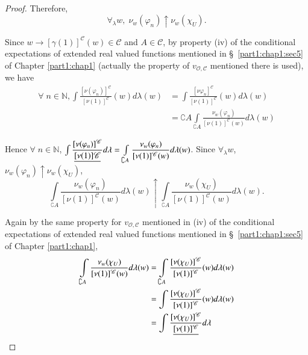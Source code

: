 \begin{proof}
Therefore, 
$$
\forall_\lambda w, \; \nu_w (\varphi_n) \uparrow \nu_w(\chi_U). 
$$

Since $w \to [\gamma (1)]^\mathscr{C}(w) \in \mathscr{C}$  and $A \in
\mathscr{C}$, by property (iv) of the conditional expectations of
extended real valued functions mentioned in \S\ \ref{part1:chap1:sec5}
of Chapter \ref{part1:chap1}
(actually the property of $v_{\mathscr{O}, \mathscr{C}}$ mentioned
there is used), we have 
\begin{align*}
\forall \; n \in \mathbb{N}, \int
\frac{[\nu(\varphi_n)]^\mathscr{C}}{[\nu(1)]^\mathscr{C}} (w) d
\lambda(w) & = \int
\frac{[\nu\varphi_n]^\mathscr{C}}{[\nu(1)]^\mathscr{C}} (w) d
\lambda(w)\\
& = \complement A \int\limits_{\complement A}
\frac{\nu_w(\varphi_n)}{[\nu(1)]^\mathscr{C}(w)} d \lambda (w)
\end{align*}

Hence $\forall \; n\in \mathbb{N}$, $\int \dfrac{[\nu
    (\varphi_n)]^\mathscr{C}}{\underline{[\nu(1)]\mathscr{C}}} d\lambda = \int\limits_{\complement A}
\dfrac{\nu_w(\varphi_n)}{[\nu(1)]^\mathscr{C} (w)}d \lambda(w)$. Since
$\forall_\lambda w$, $\nu_w (\varphi_n) \uparrow \nu_w (\chi_U)$,
$$
\int\limits_{\complement A}
\frac{\nu_w(\varphi_n)}{[\nu(1)]^\mathscr{C}(w)} d \lambda (w)
\uparrow \int\limits_{\complement A}
\frac{\nu_w(\chi_U)}{[\nu(1)]^\mathscr{C}(w)} d \lambda(w). 
$$    

Again by the same property for $v_{\mathscr{O}, \mathscr{C}}$
mentioned in (iv) of the conditional expectations of extended real
valued functions mentioned in \S\ \ref{part1:chap1:sec5} of Chapter \ref{part1:chap1}, 
\begin{align*}
\int\limits_{\complement A} \frac{\nu_w
  (\chi_U)}{[\nu(1)]^\mathscr{C}(w)} d\lambda (w) & =
\int\limits_{\complement A}
\frac{[\nu(\chi_U)]^\mathscr{C}}{[\nu(1)]^\mathscr{C}} (w)
d\lambda(w)\\
& = \int \frac{[\nu (\chi_U)]^\mathscr{C}}{[\nu(1)]^\mathscr{C}} (w) d
\lambda(w)\\
& = \int\frac{[\nu(\chi_U)]^\mathscr{C}}{\underline{[\nu(1)]^\mathscr{C}}} d\lambda
\end{align*}


\end{proof}
